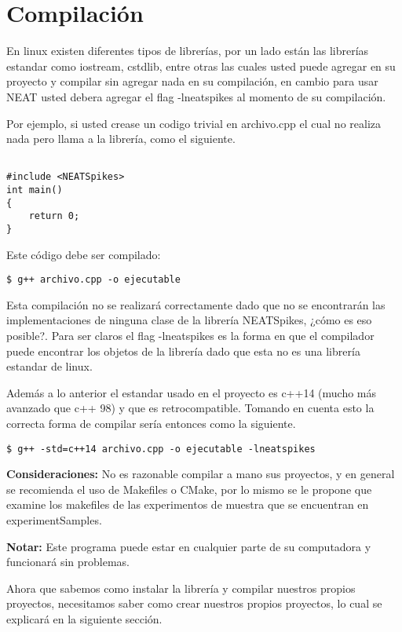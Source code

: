 \section{Compilación}

En linux existen diferentes tipos de librerías, por un lado están las librerías estandar como iostream, cstdlib, entre otras las cuales usted puede agregar en su proyecto y compilar sin agregar nada en su compilación, en cambio para usar NEAT usted debera agregar el flag -lneatspikes al momento de su compilación.\newline

Por ejemplo, si usted crease un codigo trivial en archivo.cpp el cual no realiza nada pero llama a la librería, como el siguiente. 

\begin{lstlisting}

#include <NEATSpikes>
int main()
{
	return 0;
}

\end{lstlisting}

Este código debe ser compilado:

\begin{lstlisting}
$ g++ archivo.cpp -o ejecutable
\end{lstlisting}

Esta compilación no se realizará correctamente dado que no se encontrarán las implementaciones de ninguna clase de la librería NEATSpikes, ¿cómo es eso posible?. Para ser claros el flag -lneatspikes es la forma en que el compilador puede encontrar los objetos de la librería dado que esta no es una librería estandar de linux.\newline


Además a lo anterior el estandar usado en el proyecto es c++14 (mucho más avanzado que c++ 98) y que es retrocompatible. Tomando en cuenta esto la correcta forma de compilar sería entonces como la siguiente.

\begin{lstlisting}
$ g++ -std=c++14 archivo.cpp -o ejecutable -lneatspikes
\end{lstlisting}

\textbf{Consideraciones:} No es razonable compilar a mano sus proyectos, y en general se recomienda el uso de Makefiles o CMake, por lo mismo se le propone que examine los makefiles de las experimentos de muestra que se encuentran en experimentSamples.\newline


\textbf{Notar:} Este programa puede estar en cualquier parte de su computadora y funcionará sin problemas. \newline

Ahora que sabemos como instalar la librería y compilar nuestros propios proyectos, necesitamos saber como crear nuestros propios proyectos, lo cual se explicará en la siguiente sección.